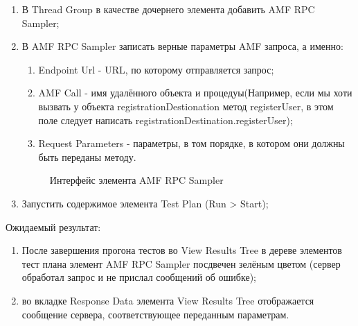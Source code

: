 \begin{enumerate}
\item В Thread Group в качестве дочернего элемента добавить AMF RPC Sampler;
\item В AMF RPC Sampler записать верные параметры AMF запроса, а именно:
\begin{enumerate}
\item Endpoint Url - URL, по которому отправляется запрос;
\item AMF Call - имя удалённого объекта и процедуы(Например, если мы хоти вызвать у объекта registrationDestionation метод registerUser,
в этом поле следует написать registrationDestination.registerUser);
\item Request Parameters - параметры, в том порядке, в котором они должны быть переданы методу.
\end{enumerate}

\begin{figure}[ht]
\caption{Интерфейс элемента AMF RPC Sampler}
\label{ris:amfSampler.png}
\end{figure}

\item Запустить содержимое элемента Test Plan (Run > Start);
\end{enumerate}

Ожидаемый результат:

\begin{enumerate}
\item После завершения прогона тестов во View Results Tree в дереве элементов тест плана элемент AMF RPC Sampler
посдвечен зелёным цветом (сервер обработал запрос и не прислал сообщений об ошибке);
\item во вкладке Response Data элемента View Results Tree отображается сообщение сервера, соответствующее
переданным параметрам.
\end{enumerate}

